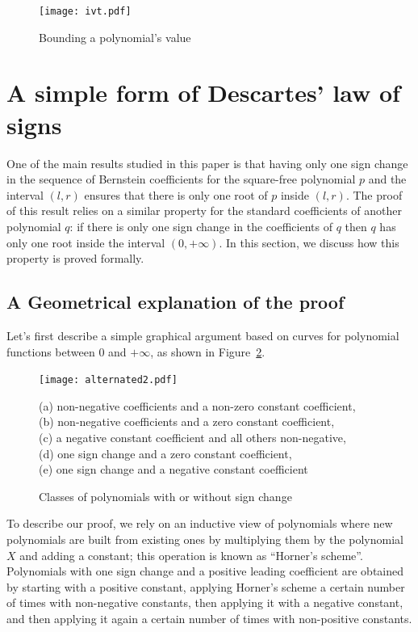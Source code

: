 \documentclass{mscs}
\begin{document}
\begin{figure}[h]
\begin{center}
\texttt{[image: ivt.pdf]}
\caption{\label{ivt} Bounding a polynomial's value}
\end{center}
\end{figure}
\section{A simple form of Descartes' law of signs}\label{sec:descartes}
One of the main results studied in this paper
is that having only one sign change in the
sequence of Bernstein coefficients for the square-free polynomial \(p\) and the
interval \((l,r)\) ensures that there is only one root of \(p\) inside
\((l,r)\).  The proof of this result relies on a similar property for
the standard coefficients of another polynomial \(q\): if there is
only one sign change in the coefficients of \(q\) then \(q\) has
only one root inside the interval \((0,+\infty)\).  In this section, we
discuss how this property is proved formally.

\subsection{A Geometrical explanation of the proof}
Let's first describe a simple graphical argument based on curves for
polynomial functions between 0 and \(+\infty\), as shown in
Figure~\ref{graph-desc}.
\begin{figure}
\begin{center}
\texttt{[image: alternated2.pdf]}
\end{center}
{(a) non-negative coefficients and a non-zero constant coefficient,\\
(b) non-negative coefficients and a zero constant coefficient,\\
(c) a negative constant coefficient and all others non-negative,\\
(d) one sign change and a zero constant coefficient,\\
(e) one sign change and a negative constant coefficient}

\caption{\label{graph-desc}
Classes of polynomials with or without
sign change}
\end{figure}
To describe our proof, we rely on an inductive view of polynomials
where new polynomials are built from
existing ones by multiplying them by the polynomial \(X\) and adding a
constant; this operation is known as ``Horner's scheme''.
Polynomials with one sign change and a positive leading coefficient
are obtained by starting with a positive constant, applying Horner's
scheme a certain number of times with non-negative constants, then
applying it with a negative constant, and then applying it again a certain
number of times with non-positive constants.
\end{document}
